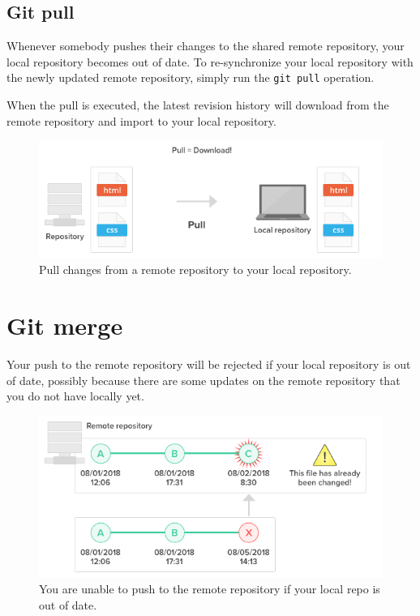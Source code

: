 \documentclass[10pt,a4paper,english]{report}
\begin{document}
    \section{Git pull}

    Whenever somebody pushes their changes to the shared remote repository, your local repository becomes out of date. To re-synchronize your local repository with the newly updated remote repository, simply run the \verb|git pull| operation.

    When the pull is executed, the latest revision history will download from the remote repository and import to your local repository.

    \begin{figure}[ht]
    \begin{center}
    \includegraphics[scale=0.5]{images/syncing_repositories_002.png}
    \end{center}
    \caption{Pull changes from a remote repository to your local repository.}
    \end{figure}

    \chapter{Git merge}

    Your push to the remote repository will be rejected if your local repository is out of date, possibly because there are some updates on the remote repository that you do not have locally yet.

    \begin{figure}[ht]
    \begin{center}
    \includegraphics[scale=0.5]{images/syncing_repositories_003.png}
    \end{center}
    \caption{You are unable to push to the remote repository if your local repo is out of date.}
    \end{figure}
\end{document}
